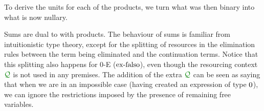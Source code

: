
To derive the units for each of the products, we turn what was then binary into
what is now nullary.


Sums are dual to with products.
The behaviour of sums is familiar from intuitionistic type theory, except for
the splitting of resources in the elimination rules between the term being
eliminated and the continuation terms.
Notice that this splitting also happens for $0$-E ($\operatorname{ex-falso}$), even though the
resourcing context $\resctx Q$ is not used in any premises.
The addition of the extra $\resctx Q$ can be seen as saying that when we are in
an impossible case (having created an expression of type $0$), we can
ignore the restrictions imposed by the presence of remaining free variables.

